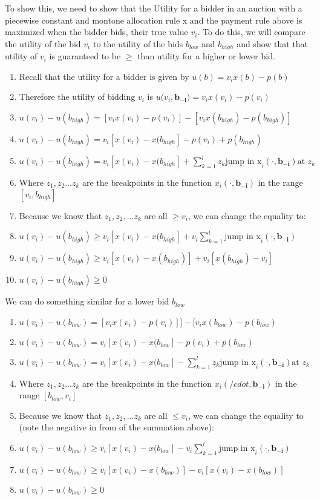 \documentclass{article}
\begin{document}
To show this, we need to show that the Utility for a bidder in an auction
with a piecewise constant and montone allocation rule x and the payment rule
above is maximized when the bidder bids, their true value $v_i$.  To do this,
we will compare the utility of the bid $v_i$ to the utility of the bids
$b_{low}$ and $b_{high}$ and show that that utility of $v_i$ is guaranteed to
be $\geq$ than utility for a higher or lower bid.

\begin{enumerate}
	\item Recall that the utility for a bidder is given by $u(b) = v_i x(b) -
		p(b)$ 
	\item Therefore the utility of bidding $v_i$ is $u(v_i, \mathbf{b_{-i})} =
		v_i x(v_i) - p(v_i)$
	\item $u(v_i) - u(b_{high}) = [v_i x(v_i) - p(v_i)] - [v_i x(b_{high}) -
		p(b_{high})]$
	\item $u(v_i) - u(b_{high}) = v_i[x(v_i) - x(b_{high}] - p(v_i) + p(b_{high})$
\item $u(v_i) - u(b_{high}) = v_i[x(v_i) - x(b_{high}] +
	\sum_{k=1}^{l}z_k\text{jump in x}_i(\cdot, \bm{b_{-i}}) \text{at }z_k $
\item Where $z_1, z_2...z_k$ are the breakpoints in the function $x_i(\cdot,
	\bm{b_{-i}})$ in the range $[v_i, b_{high}]$
\item Because we know that $z_1, z_2,...z_k$ are all $\geq v_i$, we can change
	the equality to:
\item $u(v_i) - u(b_{high}) \geq v_i[x(v_i) - x(b_{high}] + v_i
	\sum_{k=1}^{l}\text{jump in x}_i(\cdot, \bm{b_{-i}})$ 
\item $u(v_i) - u(b_{high}) \geq v_i[x(v_i) - x(b_{high})] + v_i [x(b_{high}) -
	v_i]$
\item $u(v_i) - u(b_{high}) \geq 0$
\end{enumerate}

We can do something similar for a lower bid $b_{low}$

\begin{enumerate}
\item $u(v_i) - u(b_{low}) = [v_i x(v_i) - p(v_i)]] - [v_i x(b_{low}) -
		p(b_{low})$
\item $u(v_i) - u(b_{low}) = v_i[x(v_i) - x(b_{low}] - p(v_i) + p(b_{low})$
\item $u(v_i) - u(b_{low}) = v_i[x(v_i) - x(b_{low}] -
	\sum_{k=1}^{l}z_k\text{jump in x}_i(\cdot, \bm{b_{-i}}) \text{at }z_k $
\item Where $z_1, z_2...z_k$ are the breakpoints in the function $x_i(/cdot,
	\bm{b_{-i}})$ in the range $[b_{low}, v_i]$
\item Because we know that $z_1, z_2,...z_k$ are all $\leq v_i$, we can change
	the equality to (note the negative in from of the summation above):
\item $u(v_i) - u(b_{low}) \geq v_i[x(v_i) - x(b_{low}] - v_i
	\sum_{k=1}^{l}\text{jump in x}_i(\cdot, \bm{b_{-i}})$ 
\item $u(v_i) - u(b_{low}) \geq v_i[x(v_i) - x(b_{low})] - v_i [x(v_i) -
	x(b_{low})]$
\item $u(v_i) - u(b_{low}) \geq 0$
\end{enumerate}
\end{document}
